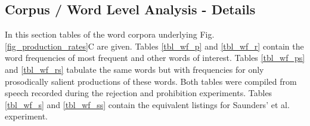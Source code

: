 \begin{screenonly}
\begin{table*}[h]
{  }
  \JoinCoffins \TC[vc,hc]\TCTable[vc,hc]
  \SetHorizontalCoffin \TCBlank{
    \begin{minipage}[c][0.5cm][c]{16cm}
    \end{minipage}
  }
  \JoinCoffins {}\TCBlank[t,l]
  \SetHorizontalCoffin {}
  \JoinCoffins {}\TCSal[t,l]
  \TypesetCoffin \TC
\end{table*}


\subsection{Corpus / Word Level Analysis - Details}
In this section tables of the word corpora underlying Fig. \ref{fig_production_rates}C are given. Tables \ref{tbl_wf_p} and \ref{tbl_wf_r} contain the word frequencies of most frequent
and other words of interest. Tables \ref{tbl_wf_ps} and \ref{tbl_wf_rs} tabulate the same words but with frequencies for only prosodically salient productions
of these words. Both tables were compiled from speech recorded during the rejection and prohibition experiments. Tables \ref{tbl_wf_s} and \ref{tbl_wf_ss}
contain the equivalent listings for Saunders' et al. experiment.
  

\end{screenonly}

